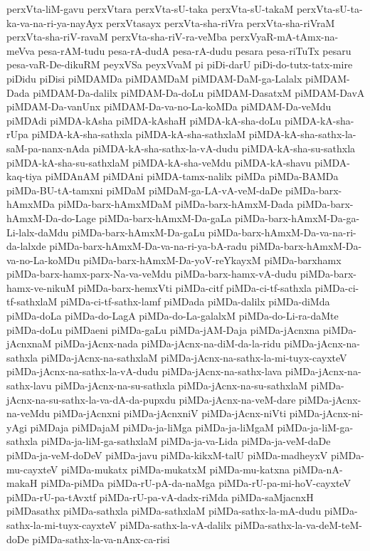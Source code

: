 {perxVta-liM-gavu
perxVtara
perxVta-sU-taka
perxVta-sU-takaM
perxVta-sU-ta-ka-va-na-ri-ya-nayAyx
perxVtasayx
perxVta-sha-riVra
perxVta-sha-riVraM
perxVta-sha-riV-ravaM
perxVta-sha-riV-ra-veMba
perxVyaR-mA-tAmx-na-meVva
pesa-rAM-tudu
pesa-rA-dudA
pesa-rA-dudu
pesara
pesa-riTuTx
pesaru
pesa-vaR-De-dikuRM
peyxVSa
peyxVvaM
pi
piDi-darU
piDi-do-tutx-tatx-mire
piDidu
piDisi
piMDAMDa
piMDAMDaM
piMDAM-DaM-ga-Lalalx
piMDAM-Dada
piMDAM-Da-dalilx
piMDAM-Da-doLu
piMDAM-DasatxM
piMDAM-DavA
piMDAM-Da-vanUnx
piMDAM-Da-va-no-La-koMDa
piMDAM-Da-veMdu
piMDAdi
piMDA-kAsha
piMDA-kAshaH
piMDA-kA-sha-doLu
piMDA-kA-sha-rUpa
piMDA-kA-sha-sathxla
piMDA-kA-sha-sathxlaM
piMDA-kA-sha-sathx-la-saM-pa-nanx-nAda
piMDA-kA-sha-sathx-la-vA-dudu
piMDA-kA-sha-su-sathxla
piMDA-kA-sha-su-sathxlaM
piMDA-kA-sha-veMdu
piMDA-kA-shavu
piMDA-kaq-tiya
piMDAnAM
piMDAni
piMDA-tamx-nalilx
piMDa
piMDa-BAMDa
piMDa-BU-tA-tamxni
piMDaM
piMDaM-ga-LA-vA-veM-daDe
piMDa-barx-hAmxMDa
piMDa-barx-hAmxMDaM
piMDa-barx-hAmxM-Dada
piMDa-barx-hAmxM-Da-do-Lage
piMDa-barx-hAmxM-Da-gaLa
piMDa-barx-hAmxM-Da-ga-Li-lalx-daMdu
piMDa-barx-hAmxM-Da-gaLu
piMDa-barx-hAmxM-Da-va-na-ri-da-lalxde
piMDa-barx-hAmxM-Da-va-na-ri-ya-bA-radu
piMDa-barx-hAmxM-Da-va-no-La-koMDu
piMDa-barx-hAmxM-Da-yoV-reYkayxM
piMDa-barxhamx
piMDa-barx-hamx-parx-Na-va-veMdu
piMDa-barx-hamx-vA-dudu
piMDa-barx-hamx-ve-nikuM
piMDa-barx-hemxVti
piMDa-citf
piMDa-ci-tf-sathxla
piMDa-ci-tf-sathxlaM
piMDa-ci-tf-sathx-lamf
piMDada
piMDa-dalilx
piMDa-diMda
piMDa-doLa
piMDa-do-LagA
piMDa-do-La-galalxM
piMDa-do-Li-ra-daMte
piMDa-doLu
piMDaeni
piMDa-gaLu
piMDa-jAM-Daja
piMDa-jAcnxna
piMDa-jAcnxnaM
piMDa-jAcnx-nada
piMDa-jAcnx-na-diM-da-la-ridu
piMDa-jAcnx-na-sathxla
piMDa-jAcnx-na-sathxlaM
piMDa-jAcnx-na-sathx-la-mi-tuyx-cayxteV
piMDa-jAcnx-na-sathx-la-vA-dudu
piMDa-jAcnx-na-sathx-lava
piMDa-jAcnx-na-sathx-lavu
piMDa-jAcnx-na-su-sathxla
piMDa-jAcnx-na-su-sathxlaM
piMDa-jAcnx-na-su-sathx-la-va-dA-da-pupxdu
piMDa-jAcnx-na-veM-dare
piMDa-jAcnx-na-veMdu
piMDa-jAcnxni
piMDa-jAcnxniV
piMDa-jAcnx-niVti
piMDa-jAcnx-ni-yAgi
piMDaja
piMDajaM
piMDa-ja-liMga
piMDa-ja-liMgaM
piMDa-ja-liM-ga-sathxla
piMDa-ja-liM-ga-sathxlaM
piMDa-ja-va-Lida
piMDa-ja-veM-daDe
piMDa-ja-veM-doDeV
piMDa-javu
piMDa-kikxM-talU
piMDa-madheyxV
piMDa-mu-cayxteV
piMDa-mukatx
piMDa-mukatxM
piMDa-mu-katxna
piMDa-nA-makaH
piMDa-piMDa
piMDa-rU-pA-da-naMga
piMDa-rU-pa-mi-hoV-cayxteV
piMDa-rU-pa-tAvxtf
piMDa-rU-pa-vA-dadx-riMda
piMDa-saMjacnxH
piMDasathx
piMDa-sathxla
piMDa-sathxlaM
piMDa-sathx-la-mA-dudu
piMDa-sathx-la-mi-tuyx-cayxteV
piMDa-sathx-la-vA-dalilx
piMDa-sathx-la-va-deM-teM-doDe
piMDa-sathx-la-va-nAnx-ca-risi
}
